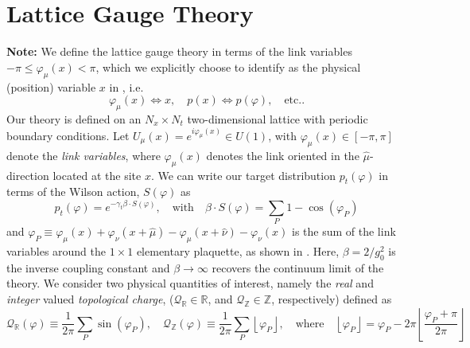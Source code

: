 \documentclass{article} %
\begin{document}
\section{\label{sec:lattice_gauge_theory}Lattice Gauge Theory}
%
\textbf{Note:} We define the lattice gauge theory in terms of the link variables \(-\pi \leq \varphi_{\mu}(x) < \pi\),
which we explicitly choose to identify as the physical (position) variable \(x\) in , i.e.\ 
\begin{equation}
   \varphi_{\mu}(x)\Longleftrightarrow x, \quad p(x)\Longleftrightarrow p(\varphi),\quad \text{etc.}.
\end{equation}
%
Our theory is defined on an \(N_{x}\times N_{t}\) two-dimensional lattice with periodic boundary conditions.
%
Let \(U_{\mu}(x) = e^{i\varphi_{\mu}(x)} \in U(1)\), with \(\varphi_{\mu}(x) \in [-\pi,\pi]\) denote the \emph{link
variables}, where \(\varphi_{\mu}(x)\) denotes the link oriented in the \(\hat{\mu}\)-direction located at the site
\(x\).
%
%
We can write our target distribution \(p_{t}(\varphi)\) in terms of the Wilson action, \(S(\varphi)\) as
%
\begin{equation}
   p_{t}(\varphi) = e^{-\gamma_{t}\beta\cdot S(\varphi)},\quad\text{with}\quad \beta\cdot S(\varphi) = \sum_{P}1 - \cos(\varphi_{P})
   \label{eq:wilsonaction}
\end{equation}
%
and \(\varphi_{P} \equiv \varphi_{\mu}(x) + \varphi_{\nu}(x+\hat{\mu}) - \varphi_{\mu}(x+\hat{\nu})
-\varphi_{\nu}(x)\) is the sum of the link variables around the \(1\times1\) elementary plaquette, as shown in
\Figref{fig:plaquette}.
%
Here, \(\beta = 2 / g_{0}^{2}\) is the inverse coupling constant and \(\beta\rightarrow\infty\) recovers the continuum
limit of the theory. 
%
We consider two physical quantities of interest, namely the \emph{real} and \emph{integer} valued \emph{topological
charge}, (\(\mathcal{Q}_{\mathbb{R}} \in \mathbb{R}\), and \(\mathcal{Q}_{\mathbb{Z}}\in\mathbb{Z}\), respectively)
defined as
%
\begin{equation*}
   \mathcal{Q}_{\mathbb{R}}(\varphi) 
   \equiv \frac{1}{2\pi}\sum_{P}\sin(\varphi_{P}),\quad%
      \mathcal{Q}_{\mathbb{Z}}(\varphi) \equiv \frac{1}{2\pi}\sum_{P}\left\lfloor\varphi_{P}\right\rfloor,
   \quad\text{where}\quad \left\lfloor\varphi_{P}\right\rfloor = \varphi_{P} -
   2\pi\left\lfloor\frac{\varphi_{P}+\pi}{2\pi}\right\rfloor
\end{equation*}
\end{document}
